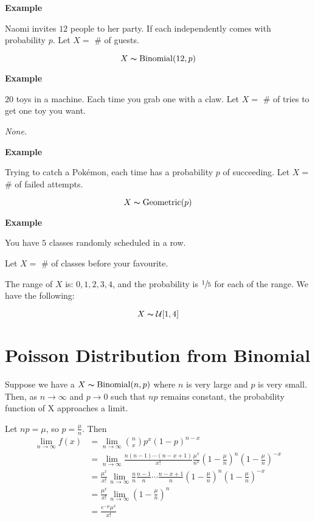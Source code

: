 \textbf{Example}

Naomi invites $ 12 $ people to her party. If each independently comes with
probability $ p $.
Let $ X= $ \# of guests.

\[ X \thicksim \operatorname{Binomial}(12,p) \]

\textbf{Example}

$ 20 $ toys in a machine. Each time you grab one with a claw.
Let $ X= $ \# of tries to get one toy you want.

\emph{None.}

\textbf{Example}

Trying to catch a Pokémon, each time has a probability $ p $ of succeeding.
Let $ X= $ \# of failed attempts.

\[ X \thicksim \operatorname{Geometric}(p) \]

\textbf{Example}

You have $ 5 $ classes randomly scheduled in a row.

Let $ X= $ \# of classes before your favourite.

The range of $ X $ is: $ 0,1,2,3,4 $, and the probability is
$ \sfrac{1}{5} $ for each of the range. We have the following:

\[ X \thicksim \operatorname{\mathcal{U}}[1,4] \]

\section{Poisson Distribution from Binomial}

Suppose we have a $ X \thicksim \operatorname{Binomial}(n,p) $ where $ n $ is very large
and $ p $ is very small. Then, as $ n\rightarrow \infty $ and $ p\rightarrow 0 $
such that $ np $ remains constant, the probability function of X
approaches a limit.

Let $ np=\mu $, so $ p=\frac{\mu}{n} $. Then
\begin{align*}
    \lim\limits_{{n} \to {\infty}} f\left(x\right)
     & =\lim\limits_{{n} \to {\infty}} \binom{n}{x}p^x\left(1-p\right)^{n-x}                            \\
     & =\lim\limits_{{n} \to {\infty}} \frac{n\left(n-1\right)\cdots\left(n-x+1\right)}{x!}
    \frac{\mu^x}{n^x} \left(1-\frac{\mu}{n}\right)^n\left(1-\frac{\mu}{n}\right)^{-x}                   \\
     & =\frac{\mu^x}{x!} \lim\limits_{{n} \to {\infty}} \frac{n}{n}
    \frac{n-1}{n} \cdots \frac{n-x+1}{n}\left(1-\frac{\mu}{n}\right)^n\left(1-\frac{\mu}{n}\right)^{-x} \\
     & =\frac{\mu^x}{x!} \lim\limits_{{n} \to {\infty}} \left(1-\frac{\mu}{n}\right)^n                  \\
     & =\frac{e^{-\mu}\mu^x}{x!}                                                                        \\
\end{align*}

